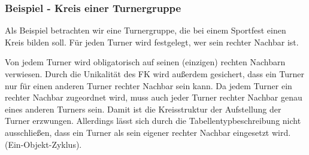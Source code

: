       \begin{center}
      \end{center}


        \subsubsection{Beispiel - Kreis einer Turnergruppe}
          Als Beispiel betrachten wir eine Turnergruppe, die bei einem Sportfest einen Kreis bilden soll. F\"ur jeden Turner wird festgelegt, wer sein rechter Nachbar ist.

          Von jedem Turner wird obligatorisch auf seinen (einzigen) rechten Nachbarn verwiesen. Durch die Unikalit\"at des FK wird au\ss erdem gesichert, dass ein Turner nur f\"ur einen anderen Turner rechter Nachbar sein kann. Da jedem Turner ein rechter Nachbar zugeordnet wird, muss auch jeder Turner rechter Nachbar genau eines anderen Turners sein. Damit ist die Kreisstruktur der Aufstellung der Turner erzwungen. Allerdings l\"asst sich durch die Tabellentypbeschreibung nicht ausschlie\ss en, dass ein Turner als sein eigener rechter Nachbar eingesetzt wird. (Ein-Objekt-Zyklus).

